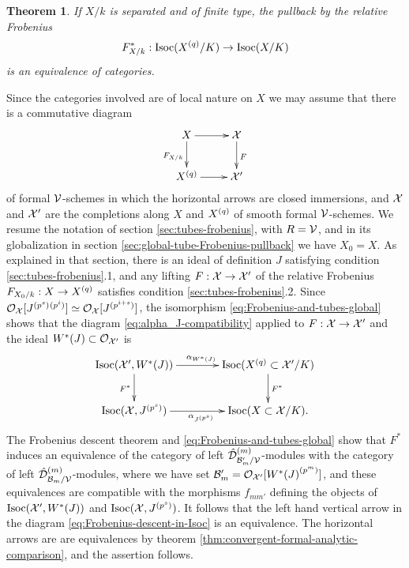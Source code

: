 \documentclass{article}
\theoremstyle{change}
\newtheorem{thm}[subsubsection]{Theorem}
\numberwithin{equation}{subsubsection}
\newcommand{\demobox}{\vrule height6pt width6pt depth0pt}
\newenvironment{demo}{\noindent{\it Proof.}}
{{\unskip\nobreak\hfil\qquad
\demobox\parfillskip=0pt\par}
\medskip}
\begin{document}
\begin{thm}\label{thm:Frobenius-descent-in-Isoc}
  If $X/k$ is separated and of finite type, the pullback by the
  relative Frobenius
  \begin{displaymath}
    F_{X/k}^*:\mathrm{Isoc}({X}^{({q})}/K)\to\mathrm{Isoc}(X/K)
  \end{displaymath}
  is an equivalence of categories.
\end{thm}
\begin{demo}
  Since the categories involved are of local nature on $X$ we may
  assume that there is a commutative diagram
  \begin{displaymath}
    \xymatrix{
      X\ar[r]\ar[d]_{F_{X/k}}&\cX\ar[d]^F\\
      \niv{X}{q}\ar[r]&\cX'
    }
  \end{displaymath}
  of formal ${\cal V}$-schemes in which the horizontal arrows are closed
  immersions, and ${\cal X}$ and ${\cal X}'$ are the completions along $X$ and
  ${X}^{({q})}$ of smooth formal ${\cal V}$-schemes. We resume the notation
  of section \ref{sec:tubes-frobenius}, with $R={\cal V}$, and in its
  globalization in section \ref{sec:global-tube-Frobenius-pullback} we
  have $X_0=X$. As explained in that section, there is an ideal of
  definition $J$ satisfying condition \ref{sec:tubes-frobenius}.1, and
  any lifting $F:{\cal X}\to{\cal X}'$ of the relative Frobenius
  $F_{X_0/k}:X\to{X}^{({q})}$ satisfies condition
  \ref{sec:tubes-frobenius}.2. Since
  ${\cal O}_{\cal X}[{J}^{({p^s})}{\relax}^{({p^i})}]\simeq{\cal O}_{\cal X}[{J}^{({p^{i+s}})}]$,
  the isomorphism \ref{eq:Frobenius-and-tubes-global} shows that the
  diagram \ref{eq:alpha_J-compatibility} applied to $F:{\cal X}\to{\cal X}'$ and
  the ideal $W^*(J)\subset{\cal O}_{{\cal X}'}$ is
  \begin{equation}
    \label{eq:Frobenius-descent-in-Isoc}
    \xymatrix@C+0.5cm{
      \Isoc(\cX',W^*(J))\ar[r]^{\alpha_{W^*(J)}}\ar[d]_{F^*}
      &\Isoc(\niv{X}{q}\subset\cX'/K)\ar[d]^{F^*}\\
      \Isoc(\cX,\niv{J}{p^s})\ar[r]_{\alpha_{\niv{J}{p^s}}}
      &\Isoc(X\subset\cX/K).
    }
  \end{equation}
  The Frobenius descent theorem and
  \ref{eq:Frobenius-and-tubes-global} show that $F^*$ induces an
  equivalence of the category of left
  ${\hat{\cal D}}^{({m})}_{{\cal B}'_m/{\cal V}}$-modules with the category of left
  ${\hat{\cal D}}^{({m})}_{{\cal B}_m/{\cal V}}$-modules, where we have set
  ${\cal B}'_m={\cal O}_{{\cal X}'}[{W^*(J)}^{({p^{m}})}]$, and these equivalences are
  compatible with the morphisms $f_{mm'}$ defining the objects of
  $\mathrm{Isoc}({\cal X}',W^*(J))$ and $\mathrm{Isoc}({\cal X},{J}^{({p^s})})$. It follows that
  the left hand vertical arrow in the diagram
  \ref{eq:Frobenius-descent-in-Isoc} is an equivalence. The horizontal
  arrows are are equivalences by theorem
  \ref{thm:convergent-formal-analytic-comparison}, and the assertion
  follows. 
\end{demo}








\end{document}
